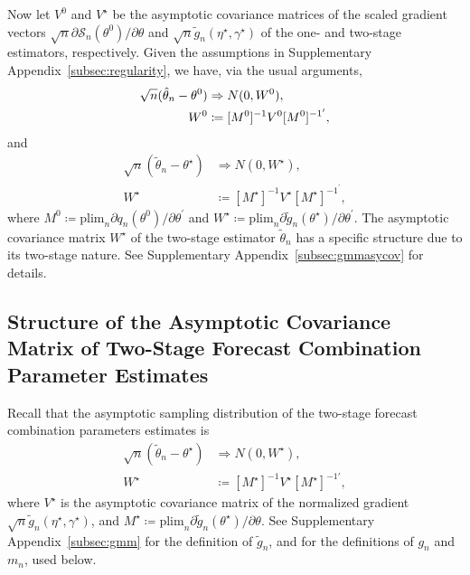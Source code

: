 \documentclass[12pt]{article}
\theoremstyle{definition}
\theoremstyle{remark}
\renewcommand{\appendixname}{Supplementary Appendix}
\begin{document}
Now let $V^0$ and $V^{\star}$ be the asymptotic covariance matrices of the scaled gradient vectors $\sqrt{n} \partial \mathcal{S}_n(\theta^0) / \partial \theta$ and $\sqrt{n} \tilde{g}_n(\eta^{\star}, \gamma^{\star})$ of the one- and two-stage estimators, respectively. Given the assumptions in \appendixname\ \ref{subsec:regularity}, we have, via the usual arguments, 
\begin{align}
\sqrt{n}(\hat{\theta}_n - \theta^0) & \Rightarrow N(0, W^0),  \notag \\
W^0 & \coloneqq [M^0]^{-1} V^0 [M^0]^{{-1}^{\prime}},  \label{eqn:onestagew}
\end{align}
and 
\begin{align*}
\sqrt{n}(\tilde{\theta}_n - \theta^{\star}) & \Rightarrow N(0, W^{\star}), \\
W^{\star} & \coloneqq [M^{\star}]^{-1} V^{\star} [M^{\star}]^{{-1}^{\prime}},
\end{align*}
where $M^0 \coloneqq \mathrm{plim}_n \partial q_n(\theta^0) / \partial \theta^{\prime}$ and $W^{\star} \coloneqq \mathrm{plim}_n \partial \tilde{g}_n(\theta^{\star}) / \partial \theta^{\prime}$. The asymptotic covariance matrix $W^{\star}$ of the two-stage estimator $\tilde{\theta}_n$ has a specific structure due to its two-stage nature. See \appendixname\ \ref{subsec:gmmasycov} for details.

\subsection{Structure of the Asymptotic Covariance Matrix of Two-Stage Forecast Combination Parameter Estimates\label{subsec:gmmasycov}}

Recall that the asymptotic sampling distribution of the two-stage forecast combination parameters estimates is 
\begin{align*}
\sqrt{n}(\tilde{\theta}_n - \theta^{\star}) & \Rightarrow N(0, W^{\star}), \\
W^{\star} & \coloneqq [M^{\star}]^{-1} V^{\star} [M^{\star}]^{-1 \prime},
\end{align*}
where $V^{\star}$ is the asymptotic covariance matrix of the normalized gradient $\sqrt{n} \tilde{g}_{n}(\eta^{\star}, \gamma^{\star})$, and $M^{\star} \coloneqq \mathrm{plim}_n \partial \tilde{g}_{n} (\theta^{\star}) / \partial \theta$. See \appendixname\ \ref{subsec:gmm} for the definition of $\tilde{g}_n$, and for the definitions of $g_n$ and $m_n$, used below.
\end{document}

